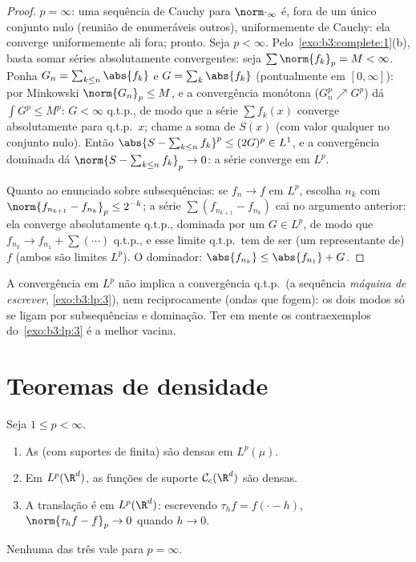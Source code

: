 \begin{proof}
$p = \infty$: uma sequência de Cauchy para $\norm\cdot_\infty$ é, fora de um único conjunto
nulo (reunião de enumeráveis outros), uniformemente de Cauchy: ela
converge uniformemente ali fora; pronto. Seja $p < \infty$.
Pelo~\cref{exo:b3:complete:1}(b), basta somar séries absolutamente convergentes:
seja $\sum\norm{f_k}_p = M < \infty$. Ponha $G_n = \sum_{k \leq n}\abs{f_k}$ e $G = \sum_k\abs{f_k}$ (pontualmente em $[0,\infty]$): por Minkowski
$\norm{G_n}_p \leq
M$, e a convergência monótona ($G_n^p \nearrow G^p$) dá $\int G^p \leq M^p$: $G < \infty$ q.t.p., de modo que
a série $\sum f_k(x)$ converge absolutamente para q.t.p.\ $x$; chame a soma de
$S(x)$ (com valor qualquer no conjunto nulo). Então $\abs{S - \sum_{k\leq n}f_k}^p \leq (2G)^p
\in L^1$, e a
convergência dominada dá $\norm{S - \sum_{k\leq n}f_k}_p \to 0$: a série converge em $L^p$.

Quanto ao enunciado sobre subsequências: se $f_n \to f$ em $L^p$, escolha
$n_k$ com $\norm{f_{n_{k+1}} - f_{n_k}}_p \leq 2^{-k}$; a série $\sum(f_{n_{k+1}} - f_{n_k})$ cai no argumento anterior: ela converge
absolutamente q.t.p., dominada por um $G \in
L^p$, de modo que $f_{n_k} \to f_{n_1} + \sum(\cdots) $ q.t.p., e
esse limite q.t.p.\ tem de ser (um representante de) $f$ (ambos são
limites $L^p$). O dominador: $\abs{f_{n_k}} \leq \abs{f_{n_1}} + G$.
\end{proof}

\begin{remark}\label{rem:b3:lp:modes}
A convergência em $L^p$ não implica a convergência q.t.p.\ (a
sequência \emph{máquina de escrever}, \cref{exo:b3:lp:3}), nem
reciprocamente (ondas que fogem): os dois modos só se ligam por
subsequências e dominação. Ter em mente os contraexemplos
do~\cref{exo:b3:lp:3} é a melhor vacina.
\end{remark}

\section{Teoremas de densidade}

\begin{theorem}\label{thm:b3:lp:density}
Seja $1 \leq p < \infty$.
\begin{enumerate}
  \item As  (com suportes de  finita) são densas
        em $L^p(\mu)$.
  \item Em $L^p(\R^d)$, as funções  de suporte  $\mathcal C_c(\R^d)$ são
        densas.
  \item A translação é  em $L^p(\R^d)$: escrevendo $\tau_hf = f(\cdot - h)$, $\norm{\tau_hf - f}_p \to 0$ quando
        $h \to 0$.
\end{enumerate}
Nenhuma das três vale para $p = \infty$.
\end{theorem}

